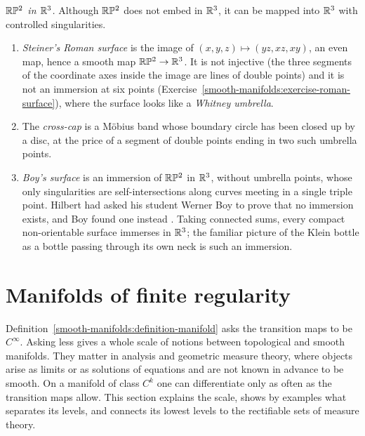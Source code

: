 \begin{remark}\label{smooth-manifolds:remark-rp2-r3}
\emph{$\mathbb{R}\mathbb{P}^2$ in $\mathbb{R}^3$.} Although $\mathbb{R}\mathbb{P}^2$ does not embed in $\mathbb{R}^3$, it can be mapped into $\mathbb{R}^3$ with controlled singularities.
\begin{enumerate}
\item \emph{Steiner's Roman surface} is the image of $(x, y, z) \mapsto (yz, xz, xy)$, an even map, hence a smooth map $\mathbb{R}\mathbb{P}^2 \to \mathbb{R}^3$. It is not injective (the three segments of the coordinate axes inside the image are
lines of double points) and it is not an immersion at six points (Exercise~\ref{smooth-manifolds:exercise-roman-surface}), where the surface looks like a \emph{Whitney umbrella}.
\item The \emph{cross-cap} is a M\"obius band whose boundary circle has been closed up by a disc, at the price of a segment of double points ending in two such umbrella points.
\item \emph{Boy's surface} is an immersion of $\mathbb{R}\mathbb{P}^2$ in $\mathbb{R}^3$, without umbrella points, whose only singularities are self-intersections along curves meeting in a single triple point. Hilbert had asked his student Werner Boy
to prove that no immersion exists, and Boy found one instead \cite{boy-1903}. Taking connected sums, every compact non-orientable surface immerses in $\mathbb{R}^3$; the familiar picture of the Klein bottle as a bottle passing
through its own neck is such an immersion.
\end{enumerate}
\end{remark}

\section{Manifolds of finite regularity}\label{smooth-manifolds:section-regularity}

Definition~\ref{smooth-manifolds:definition-manifold} asks the transition maps to be $C^\infty$. Asking less gives a whole scale of notions between topological and smooth manifolds. They matter in analysis
and geometric measure theory, where objects arise as limits or as solutions of equations and are not known in advance to be smooth. On a manifold of class $C^k$ one can differentiate only as often as the
transition maps allow. This section explains the scale, shows by examples what separates its levels, and connects its lowest levels to the rectifiable sets of measure theory.

